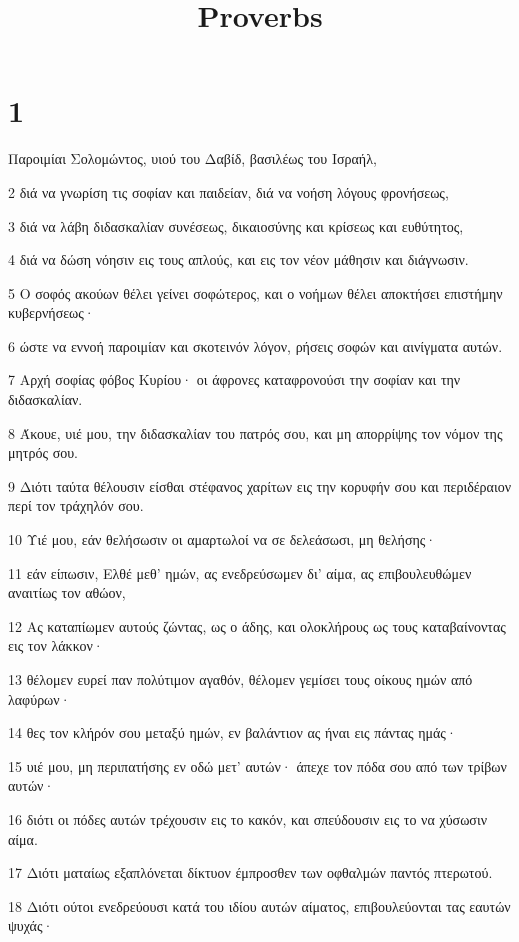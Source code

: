 

\title{Proverbs}


\chapter{1}

\par Παροιμίαι Σολομώντος, υιού του Δαβίδ, βασιλέως του Ισραήλ,
\par 2 διά να γνωρίση τις σοφίαν και παιδείαν, διά να νοήση λόγους φρονήσεως,
\par 3 διά να λάβη διδασκαλίαν συνέσεως, δικαιοσύνης και κρίσεως και ευθύτητος,
\par 4 διά να δώση νόησιν εις τους απλούς, και εις τον νέον μάθησιν και διάγνωσιν.
\par 5 Ο σοφός ακούων θέλει γείνει σοφώτερος, και ο νοήμων θέλει αποκτήσει επιστήμην κυβερνήσεως·
\par 6 ώστε να εννοή παροιμίαν και σκοτεινόν λόγον, ρήσεις σοφών και αινίγματα αυτών.
\par 7 Αρχή σοφίας φόβος Κυρίου· οι άφρονες καταφρονούσι την σοφίαν και την διδασκαλίαν.
\par 8 Άκουε, υιέ μου, την διδασκαλίαν του πατρός σου, και μη απορρίψης τον νόμον της μητρός σου.
\par 9 Διότι ταύτα θέλουσιν είσθαι στέφανος χαρίτων εις την κορυφήν σου και περιδέραιον περί τον τράχηλόν σου.
\par 10 Υιέ μου, εάν θελήσωσιν οι αμαρτωλοί να σε δελεάσωσι, μη θελήσης·
\par 11 εάν είπωσιν, Ελθέ μεθ' ημών, ας ενεδρεύσωμεν δι' αίμα, ας επιβουλευθώμεν αναιτίως τον αθώον,
\par 12 Ας καταπίωμεν αυτούς ζώντας, ως ο άδης, και ολοκλήρους ως τους καταβαίνοντας εις τον λάκκον·
\par 13 θέλομεν ευρεί παν πολύτιμον αγαθόν, θέλομεν γεμίσει τους οίκους ημών από λαφύρων·
\par 14 θες τον κλήρόν σου μεταξύ ημών, εν βαλάντιον ας ήναι εις πάντας ημάς·
\par 15 υιέ μου, μη περιπατήσης εν οδώ μετ' αυτών· άπεχε τον πόδα σου από των τρίβων αυτών·
\par 16 διότι οι πόδες αυτών τρέχουσιν εις το κακόν, και σπεύδουσιν εις το να χύσωσιν αίμα.
\par 17 Διότι ματαίως εξαπλόνεται δίκτυον έμπροσθεν των οφθαλμών παντός πτερωτού.
\par 18 Διότι ούτοι ενεδρεύουσι κατά του ιδίου αυτών αίματος, επιβουλεύονται τας εαυτών ψυχάς·
